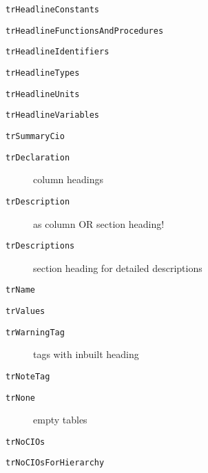 \documentclass{report}
\begin{document}
\begin{list}{}
\begin{description}
\item[\texttt{trHeadlineConstants}] \label{PasDoc_Languages-trHeadlineConstants}
\index{}
 
\item[\texttt{trHeadlineFunctionsAndProcedures}] \label{PasDoc_Languages-trHeadlineFunctionsAndProcedures}
\index{}
 
\item[\texttt{trHeadlineIdentifiers}] \label{PasDoc_Languages-trHeadlineIdentifiers}
\index{}
 
\item[\texttt{trHeadlineTypes}] \label{PasDoc_Languages-trHeadlineTypes}
\index{}
 
\item[\texttt{trHeadlineUnits}] \label{PasDoc_Languages-trHeadlineUnits}
\index{}
 
\item[\texttt{trHeadlineVariables}] \label{PasDoc_Languages-trHeadlineVariables}
\index{}
 
\item[\texttt{trSummaryCio}] \label{PasDoc_Languages-trSummaryCio}
\index{}
 
\item[\texttt{trDeclaration}] \label{PasDoc_Languages-trDeclaration}
\index{}
column headings
\item[\texttt{trDescription}] \label{PasDoc_Languages-trDescription}
\index{}
as column OR section heading!
\item[\texttt{trDescriptions}] \label{PasDoc_Languages-trDescriptions}
\index{}
section heading for detailed descriptions
\item[\texttt{trName}] \label{PasDoc_Languages-trName}
\index{}
 
\item[\texttt{trValues}] \label{PasDoc_Languages-trValues}
\index{}
 
\item[\texttt{trWarningTag}] \label{PasDoc_Languages-trWarningTag}
\index{}
tags with inbuilt heading
\item[\texttt{trNoteTag}] \label{PasDoc_Languages-trNoteTag}
\index{}
 
\item[\texttt{trNone}] \label{PasDoc_Languages-trNone}
\index{}
empty tables
\item[\texttt{trNoCIOs}] \label{PasDoc_Languages-trNoCIOs}
\index{}
 
\item[\texttt{trNoCIOsForHierarchy}] \label{PasDoc_Languages-trNoCIOsForHierarchy}
\index{}
 

\end{description}
\end{list}
\end{document}
